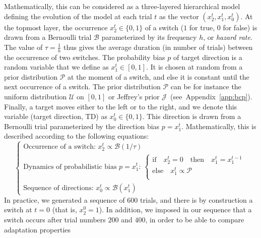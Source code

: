 \documentclass[12pt,english]{article}%
\newcommand{\choice}[1]{ %
	\left\{ %
		\begin{array}{l} #1 \end{array} %
	\right. }
\newcommand{\eql}[1]{\begin{equation}#1\end{equation}}
\newcommand{\Bb}{\mathcal{B}}
\newcommand{\Jj}{\mathcal{J}}
\newcommand{\Pp}{\mathcal{P}}
\newcommand{\Uu}{\mathcal{U}}
\newcommand{\seeApp}[1]{Appendix~\ref{app:#1}}
\begin{document}
Mathematically, this can be considered as a three-layered hierarchical model
defining the evolution of the model at each trial $t$ as the vector  $(x_2^t, x_1^t, x_0^t)$.
At the topmost layer,
the occurrence $x_2^t \in \{ 0, 1 \}$ of a switch ($1$ for true, $0$ for false)
is  drawn from a Bernoulli trial $\Bb$ parameterized by its frequency $h$, or \emph{hazard rate}.
The value of $\tau=\frac 1 h$ thus gives the average duration (in number of trials)
between the occurrence of two switches.
The probability bias $p$ of target direction is a random variable that we define as $x_1^t \in [0, 1]$.
It is chosen at random from a prior distribution $\Pp$
at the moment of a switch,
and else it is constant until the next occurrence of a switch.
The prior distribution $\Pp$ can be for instance
the uniform distribution $\Uu$ on $ [ 0, 1 ] $ or
Jeffrey's prior $\Jj$~(see~\seeApp{bcp}).
Finally, a target moves either to the left or to the right,
and we denote this variable (target direction, TD) as $x_0^t \in \{ 0, 1 \}$.
This direction is drawn from a Bernoulli trial
parameterized by the direction bias $p=x_1^t$.
Mathematically, this is  described according to the following equations:
 \eql{\choice{
\text{Occurrence of a switch: } x_2^t \propto \Bb(1/\tau) \\
\text{Dynamics of probabilistic bias $p=x_1^t$: }
 \choice{\text{if} \quad x_2^t=0 \quad \text{then} \quad  x_1^t = x_1^{t-1} \\
 \text{else} \quad x_1^t \propto \Pp  \\
 } \\
\text{Sequence of directions: } x_0^t \propto \Bb(x_1^t)
 }\label{eq:bsm}}
In practice, we generated a sequence of $600$ trials,
and there is by construction a switch at $t=0$ (that is, $x_2^0=1$).
In addition, we imposed in our sequence that a switch
occurs after trial numbers $200$ and $400$,
in order to be able to compare adaptation properties 
\end{document}
